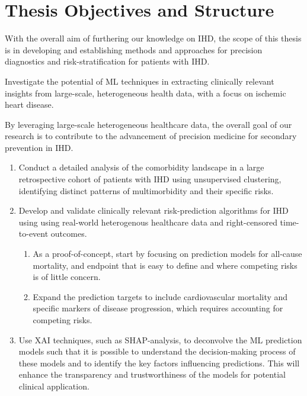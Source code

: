 \chapter{Thesis Objectives and Structure} 
\label{chap:overview}

With the overall aim of furthering our knowledge on 
\ac{IHD}, the scope of this thesis is in
developing and establishing methods and approaches for 
precision diagnostics and risk-stratification 
for patients with \ac{IHD}. 

Investigate the potential of \ac{ML} techniques in
extracting clinically relevant insights from large-scale, 
heterogeneous health data, with a focus on ischemic heart disease.

By leveraging large-scale heterogeneous healthcare data,
the overall goal of our research is to contribute to the advancement of 
precision medicine for secondary prevention in \ac{IHD}.

\begin{enumerate}
    \item Conduct a detailed analysis of the comorbidity landscape in 
        a large retrospective cohort of patients with \ac{IHD} using
        unsupervised clustering, identifying distinct
        patterns of multimorbidity and their specific risks.
    \item Develop and validate clinically relevant 
        risk-prediction algorithms for \ac{IHD} using using real-world 
        heterogenous healthcare data and right-censored time-to-event 
        outcomes.
    \begin{enumerate}
        \item As a proof-of-concept, start by focusing on prediction
            models for all-cause mortality, and endpoint that is easy to 
            define and where competing risks is of little concern.
        \item Expand the prediction targets to include cardiovascular
            mortality and specific markers of disease progression, 
            which requires accounting for competing risks.
    \end{enumerate}

    \item Use \ac{XAI} techniques, such as \ac{SHAP}-analysis, to deconvolve 
        the \ac{ML} prediction models such that it is possible to understand 
        the decision-making process of these models and to identify the key 
        factors influencing predictions. This will enhance the
        transparency and trustworthiness of the models for potential clinical 
        application.
\end{enumerate}

